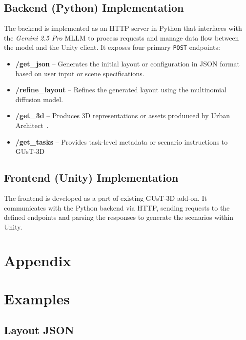 \documentclass{article}
\begin{document}
\subsection{Backend (Python) Implementation}

The backend is implemented as an HTTP server in Python that interfaces with the \textit{Gemini 2.5 Pro} MLLM to process requests and manage data flow between the model and the Unity client. 
It exposes four primary \texttt{POST} endpoints:

\begin{itemize}
    \item \textbf{/get\_json} – Generates the initial layout or configuration in JSON format based on user input or scene specifications.
    \item \textbf{/refine\_layout} – Refines the generated layout using the multinomial diffusion model.
    \item \textbf{/get\_3d} – Produces 3D representations or assets produuced by Urban Architect~\cite{lu2024urban}.
    \item \textbf{/get\_tasks} – Provides task-level metadata or scenario instructions to GUsT-3D
\end{itemize}

\subsection{Frontend (Unity) Implementation}

The frontend is developed as a part of existing GUsT-3D add-on. It communicates with the Python backend via HTTP, sending requests to the defined endpoints and parsing the responses to generate the scenarios within Unity. 

\section*{Appendix}

\section{Examples}

\subsection{Layout JSON}
\label{app:examples:example_json}
\end{document}
